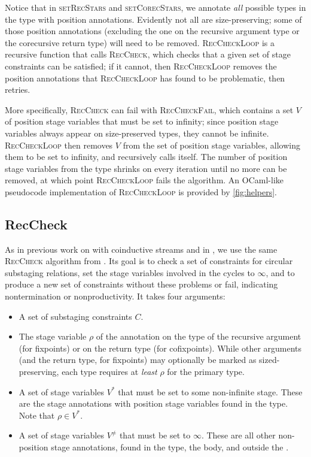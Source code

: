 \documentclass[sigplan,10pt,anonymous,review]{acmart}
\begin{document}


Notice that in \textsc{setRecStars} and \textsc{setCorecStars}, we annotate \textit{all} possible \coinductive types in the \cofixpoint type with position annotations. Evidently not all \cofixpoints are size-preserving; some of those position annotations (excluding the one on the recursive argument type or the corecursive return type) will need to be removed. \textsc{RecCheckLoop} is a recursive function that calls \textsc{RecCheck}, which checks that a given set of stage constraints can be satisfied; if it cannot, then \textsc{RecCheckLoop} removes the position annotations that \textsc{RecCheckLoop} has found to be problematic, then retries.

More specifically, \textsc{RecCheck} can fail with \textsc{RecCheckFail}, which contains a set $V$ of position stage variables that must be set to infinity; since position stage variables always appear on size-preserved types, they cannot be infinite. \textsc{RecCheckLoop} then removes $V$ from the set of position stage variables, allowing them to be set to infinity, and recursively calls itself. The number of position stage variables from the \cofixpoint type shrinks on every iteration until no more can be removed, at which point \textsc{RecCheckLoop} fails the algorithm. An OCaml-like pseudocode implementation of \textsc{RecCheckLoop} is provided by \autoref{fig:helpers}.

\subsection{RecCheck}

As in previous work on \CChatomega with coinductive streams \cite{cc-hat-omega} and in \CIChat, we use the same \textsc{RecCheck} algorithm from \Fhat \cite{f-hat}. Its goal is to check a set of constraints for circular substaging relations, set the stage variables involved in the cycles to $\infty$, and to produce a new set of constraints without these problems or fail, indicating nontermination or nonproductivity. It takes four arguments:

\begin{itemize}
    \item A set of substaging constraints $C$.
    \item The stage variable $\rho$ of the annotation on the type of the recursive argument (for fixpoints) or on the return type (for cofixpoints). While other arguments (and the return type, for fixpoints) may optionally be marked as sized-preserving, each \cofixpoint type requires at \textit{least} $\rho$ for the primary \corecursive type.
    \item A set of stage variables $V^*$ that must be set to some non-infinite stage. These are the stage annotations with position stage variables found in the \cofixpoint type. Note that $\rho \in V^*$.
    \item A set of stage variables $V^\neq$ that must be set to $\infty$. These are all other non-position stage annotations, found in the \cofixpoint type, the \cofixpoint body, and outside the \cofixpoint.
\end{itemize}
\end{document}
